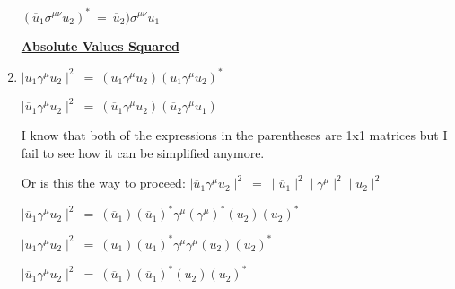 \documentclass[12pt]{article}
\def \ga{\gamma}
\def \si{\sigma}
\begin{document}
\begin{enumerate}
$(\overline{u}_1 \si^{\mu\nu} u_2)^* ~=~\overline{u}_2) \si^{\mu\nu} u_1 $


\begin{center}
\underline{\textbf{\Large Absolute Values Squared}}
\end{center}
\item $\mid \overline{u}_1 \ga^\mu u_2 \mid^2 ~=~ (\overline{u}_1 \ga^\mu u_2)(\overline{u}_1 \ga^\mu u_2 )^*$

$\mid \overline{u}_1 \ga^\mu u_2 \mid^2 ~=~ (\overline{u}_1 \ga^\mu u_2)(\overline{u}_2 \ga^\mu u_1)$

I know that both of the expressions in the parentheses are 1x1 matrices but I fail to see how it can be simplified anymore.

Or is this the way to proceed:
$\mid \overline{u}_1 \ga^\mu u_2 \mid^2 ~=~ \mid\overline{u}_1\mid^2 \mid\ga^\mu\mid^2 \mid u_2 \mid^2$

$\mid \overline{u}_1 \ga^\mu u_2 \mid^2 ~=~ (\overline{u}_1)(\overline{u}_1)^*\ga^\mu (\ga^\mu)^* (u_2)(u_2)^*$

$\mid \overline{u}_1 \ga^\mu u_2 \mid^2 ~=~ (\overline{u}_1)(\overline{u}_1)^*\ga^\mu \ga^\mu (u_2)(u_2)^*$

$\mid \overline{u}_1 \ga^\mu u_2 \mid^2 ~=~ (\overline{u}_1)(\overline{u}_1)^* (u_2)(u_2)^*$

\end{enumerate}
\end{document}
